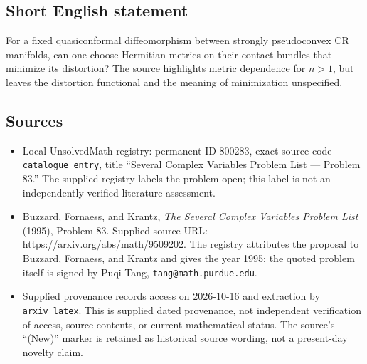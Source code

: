\documentclass[11pt]{article}
\begin{document}
\subsection{Short English statement}
For a fixed quasiconformal diffeomorphism between strongly pseudoconvex CR manifolds, can one choose Hermitian metrics on their contact bundles that minimize its distortion? The source highlights metric dependence for \(n>1\), but leaves the distortion functional and the meaning of minimization unspecified.
\subsection{Sources}
\begin{itemize}
\item Local UnsolvedMath registry: permanent ID \(800283\), exact source code \texttt{catalogue entry}, title ``Several Complex Variables Problem List --- Problem 83.'' The supplied registry labels the problem open; this label is not an independently verified literature assessment.
\item Buzzard, Fornaess, and Krantz, \emph{The Several Complex Variables Problem List} (1995), Problem 83. Supplied source URL: \url{https://arxiv.org/abs/math/9509202}. The registry attributes the proposal to Buzzard, Fornaess, and Krantz and gives the year 1995; the quoted problem itself is signed by Puqi Tang, \texttt{tang@math.purdue.edu}.
\item Supplied provenance records access on 2026-10-16 and extraction by \texttt{arxiv\_latex}. This is supplied dated provenance, not independent verification of access, source contents, or current mathematical status. The source's ``(New)'' marker is retained as historical source wording, not a present-day novelty claim.
\end{itemize}
\end{document}

